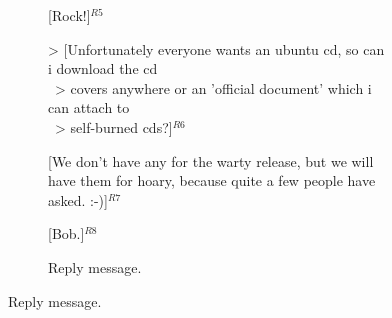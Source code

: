 \begin{figure}
\begin{minipage}{.63\textwidth}
{{\begin{subfigure}[b]{0.9\textwidth}
[Rock!]$^{R5}$\vspace{0.1cm}

> [Unfortunately everyone wants an ubuntu cd, so can i download the cd\\ \ 
> covers anywhere or an 'official document' which i can attach to\\ \ 
> self-burned cds?]$^{R6}$\vspace{0.1cm}

[We don't have any for the warty release, but we will have them for hoary, %
because quite a few people have asked. :-)]$^{R7}$\vspace{0.1cm}

[Bob.]$^{R8}$ %


                \caption{Reply message.}
                \label{fig:exampleReply}
        \end{subfigure}
}}




\end{minipage}
\end{figure}
